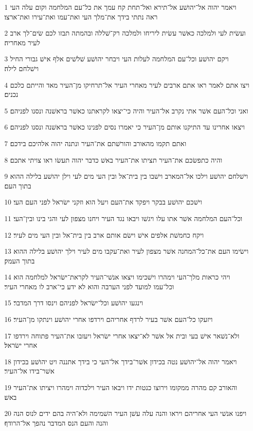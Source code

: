 \par 1 ויאמר יהוה אל־יהושׁע אל־תירא ואל־תחת קח עמך את כל־עם המלחמה וקום עלה העי ראה נתתי בידך את־מלך העי ואת־עמו ואת־עירו ואת־ארצו׃
\par 2 ועשׂית לעי ולמלכה כאשׁר עשׂית ליריחו ולמלכה רק־שׁללה ובהמתה תבזו לכם שׂים־לך ארב לעיר מאחריה׃
\par 3 ויקם יהושׁע וכל־עם המלחמה לעלות העי ויבחר יהושׁע שׁלשׁים אלף אישׁ גבורי החיל וישׁלחם לילה׃
\par 4 ויצו אתם לאמר ראו אתם ארבים לעיר מאחרי העיר אל־תרחיקו מן־העיר מאד והייתם כלכם נכנים׃
\par 5 ואני וכל־העם אשׁר אתי נקרב אל־העיר והיה כי־יצאו לקראתנו כאשׁר בראשׁנה ונסנו לפניהם׃
\par 6 ויצאו אחרינו עד התיקנו אותם מן־העיר כי יאמרו נסים לפנינו כאשׁר בראשׁנה ונסנו לפניהם׃
\par 7 ואתם תקמו מהאורב והורשׁתם את־העיר ונתנה יהוה אלהיכם בידכם׃
\par 8 והיה כתפשׂכם את־העיר תציתו את־העיר באשׁ כדבר יהוה תעשׂו ראו צויתי אתכם׃
\par 9 וישׁלחם יהושׁע וילכו אל־המארב וישׁבו בין בית־אל ובין העי מים לעי וילן יהושׁע בלילה ההוא בתוך העם׃
\par 10 וישׁכם יהושׁע בבקר ויפקד את־העם ויעל הוא וזקני ישׂראל לפני העם העי׃
\par 11 וכל־העם המלחמה אשׁר אתו עלו ויגשׁו ויבאו נגד העיר ויחנו מצפון לעי והגי בינו ובין־העי׃
\par 12 ויקח כחמשׁת אלפים אישׁ וישׂם אותם ארב בין בית־אל ובין העי מים לעיר׃
\par 13 וישׂימו העם את־כל־המחנה אשׁר מצפון לעיר ואת־עקבו מים לעיר וילך יהושׁע בלילה ההוא בתוך העמק׃
\par 14 ויהי כראות מלך־העי וימהרו וישׁכימו ויצאו אנשׁי־העיר לקראת־ישׂראל למלחמה הוא וכל־עמו למועד לפני הערבה והוא לא ידע כי־ארב לו מאחרי העיר׃
\par 15 וינגעו יהושׁע וכל־ישׂראל לפניהם וינסו דרך המדבר׃
\par 16 ויזעקו כל־העם אשׁר בעיר לרדף אחריהם וירדפו אחרי יהושׁע וינתקו מן־העיר׃
\par 17 ולא־נשׁאר אישׁ בעי ובית אל אשׁר לא־יצאו אחרי ישׂראל ויעזבו את־העיר פתוחה וירדפו אחרי ישׂראל׃
\par 18 ויאמר יהוה אל־יהושׁע נטה בכידון אשׁר־בידך אל־העי כי בידך אתננה ויט יהושׁע בכידון אשׁר־בידו אל־העיר׃
\par 19 והאורב קם מהרה ממקומו וירוצו כנטות ידו ויבאו העיר וילכדוה וימהרו ויציתו את־העיר באשׁ׃
\par 20 ויפנו אנשׁי העי אחריהם ויראו והנה עלה עשׁן העיר השׁמימה ולא־היה בהם ידים לנוס הנה והנה והעם הנס המדבר נהפך אל־הרודף׃
